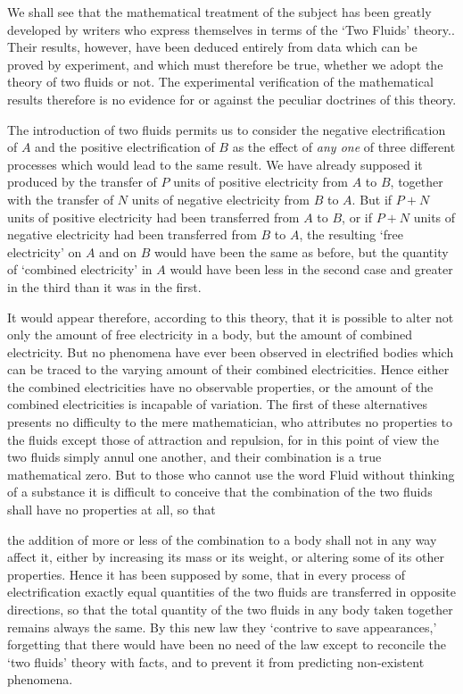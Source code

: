 \documentclass[11pt,a4paper]{article}
\begin{document}
We shall see that the mathematical treatment of the subject has been
greatly developed by writers who express themselves in terms of the
`Two Fluids' theory.. Their results, however, have been deduced
entirely from data which can be proved by experiment, and which must
therefore be true, whether we adopt the theory of two fluids or not. The
experimental verification of the mathematical results therefore is no
evidence for or against the peculiar doctrines of this theory.

The introduction of two fluids permits us to consider the negative
electrification of \(A\) and the positive electrification of \(B\) as
the effect of \textit{any one} of three different processes which would
lead to the same result. We have already supposed it produced by the
transfer of \(P\) units of positive electricity from \(A\) to \(B\),
together with the transfer of \(N\) units of negative electricity from
\(B\) to \(A\). But if \(P+N\) units of positive electricity had been
transferred from \(A\) to \(B\), or if \(P+N\) units of negative
electricity had been transferred from \(B\) to \(A\), the resulting
`free electricity' on \(A\) and on \(B\) would have been the same as
before, but the quantity of `combined electricity' in \(A\) would have
been less in the second case and greater in the third than it was in the
first.

It would appear therefore, according to this theory, that it is possible
to alter not only the amount of free electricity in a body, but the
amount of combined electricity. But no phenomena have ever been observed
in electrified bodies which can be traced to the varying amount of their
combined electricities. Hence either the combined electricities have no
observable properties, or the amount of the combined electricities is
incapable of variation. The first of these alternatives presents no
difficulty to the mere mathematician, who attributes no properties to
the fluids except those of attraction and repulsion, for in this point
of view the two fluids simply annul one another, and their combination
is a true mathematical zero. But to those who cannot use the word Fluid
without thinking of a substance it is difficult to conceive that the
combination of the two fluids shall have no properties at all, so that

\clearpage
\setcounter{footnote}{0}

the addition of more or less of the combination to a body shall not in
any way affect it, either by increasing its mass or its weight, or
altering some of its other properties. Hence it has been supposed by
some, that in every process of electrification exactly equal quantities
of the two fluids are transferred in opposite directions, so that the
total quantity of the two fluids in any body taken together remains
always the same. By this new law they `contrive to save appearances,'
forgetting that there would have been no need of the law except to
reconcile the `two fluids' theory with facts, and to prevent it from
predicting non-existent phenomena.
\end{document}
